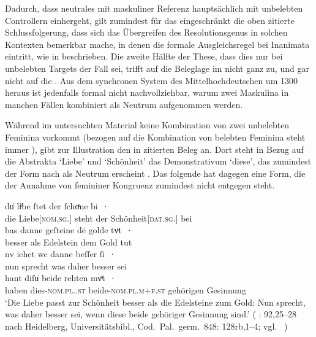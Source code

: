 Dadurch, dass neutrales  mit maskuliner Referenz hauptsächlich mit
unbelebten Controllern einhergeht, gilt zumindest für das \CAO{}
eingeschränkt die oben zitierte Schlussfolgerung, dass sich das Übergreifen des
Resolutionsgenus in solchen Kontexten bemerkbar mache, in denen die formale
Ausgleichsregel bei Inanimata eintritt, wie in 
beschrieben. Die zweite Hälfte der These, dass dies nur bei unbelebten Targets
der Fall sei, trifft auf die Beleglage im \CAO{} nicht ganz zu, und gar nicht
auf die \KC{}. Aus dem synchronen System des
Mittelhochdeutschen um 1300 heraus ist jedenfalls formal
nicht nachvollziehbar, warum zwei Maskulina in manchen Fällen kombiniert als
Neutrum aufgenommen werden.

Während im untersuchten Material keine Kombination von zwei unbelebten Feminina
vorkommt (bezogen auf die Kombination von belebten Feminina steht
immer ), gibt \citet[384]{paul2007} zur Illustration den in
 zitierten Beleg an. Dort steht in Bezug auf die
Abstrakta  `Liebe' und  `Schönheit' das Demonstrativum
 `diese', das zumindest der Form nach als Neutrum erscheint
\autocite[485]{ksw2}. Das folgende  hat dagegen eine Form, die der
Annahme von femininer Kongruenz zumindest nicht entgegen steht.

\begin{exe}
\ex\label{ex:walther92_25-28_C_2}
	\gll du̍ liͤbe ſtet der ſchoͤne bi~· \\
			die Liebe[\textsc{nom.sg.\FemI}] steht der
			Schönheit[\textsc{dat.sg.\FemI}] bei \\
\sn \gll bas danne geſteine dē golde tvͦt~· \\
		besser als Edelstein dem Gold tut \\
\sn \gll nv iehet wc danne beſſer ſi~· \\
		nun sprecht was daher besser sei \\
\sn \gll hant diſu̍ beide rehten mvͦt~· \\
		haben dies-\textsc{nom.pl.\NeutI.st} beide-\textsc{nom.pl.m+f\subI.st}
			gehörigen Gesinnung \\
	\trans `Die Liebe passt zur Schönheit besser als die Edelsteine zum
		Gold: Nun sprecht, was daher besser sei, wenn diese beide gehöriger
		Gesinnung sind.'
		(%
			: 92,25--28 nach
			Heidelberg, Universitätsbibl., Cod.~Pal.~germ.~848: 128rb,1--4;
			vgl.~\cite[356--358]{bein2013}%
		)
	\\
\end{exe}

